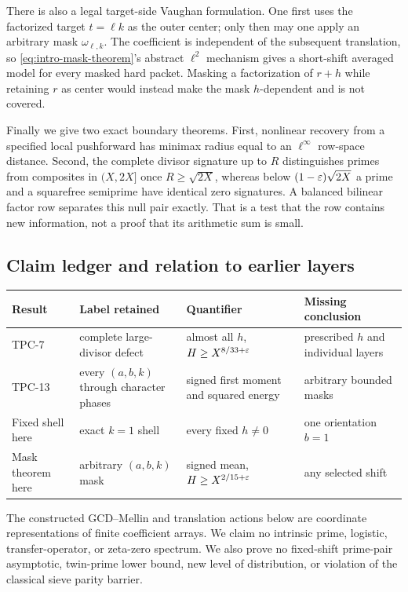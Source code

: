 There is also a legal target-side Vaughan formulation.  One first uses the
factorized target $t=\ell k$ as the outer center; only then may one apply an
arbitrary mask $\omega_{\ell,k}$.  The coefficient is independent of the
subsequent translation, so \eqref{eq:intro-mask-theorem}'s abstract
$\ell^2$ mechanism gives a short-shift averaged model for every masked hard
packet.  Masking a factorization of $r+h$ while retaining $r$ as center
would instead make the mask $h$-dependent and is not covered.

Finally we give two exact boundary theorems.  First, nonlinear recovery from
a specified local pushforward has minimax radius equal to an
$\ell^\infty$ row-space distance.  Second, the complete divisor signature
up to $R$ distinguishes primes from composites in $(X,2X]$ once
$R\geq\sqrt{2X}$, whereas below
$(1-\varepsilon)\sqrt{2X}$ a prime and a squarefree semiprime have identical zero
signatures.  A balanced bilinear factor row separates this null pair exactly.
That is a test that the row contains new information, not a proof that its
arithmetic sum is small.

\subsection{Claim ledger and relation to earlier layers}

\begin{center}
\small
\begin{tabular}{
 >{\raggedright\arraybackslash}p{}
 >{\raggedright\arraybackslash}p{}
 >{\raggedright\arraybackslash}p{}
 >{\raggedright\arraybackslash}p{}}
\toprule
Result & Label retained & Quantifier & Missing conclusion\\
\midrule
TPC-7 & complete large-divisor defect & almost all $h$, $H\geq X^{8/33+\varepsilon}$ & prescribed $h$ and individual layers\\
TPC-13 & every $(a,b,k)$ through character phases & signed first moment and squared energy & arbitrary bounded masks\\
Fixed shell here & exact $k=1$ shell & every fixed $h\ne0$ & one orientation $b=1$\\
Mask theorem here & arbitrary $(a,b,k)$ mask & signed mean, $H\geq X^{2/15+\varepsilon}$ & any selected shift\\
\bottomrule
\end{tabular}
\end{center}

The constructed GCD--Mellin and translation actions below are coordinate
representations of finite coefficient arrays.  We claim no intrinsic prime,
logistic, transfer-operator, or zeta-zero spectrum.  We also prove no
fixed-shift prime-pair asymptotic, twin-prime lower bound, new level of
distribution, or violation of the classical sieve parity barrier.
